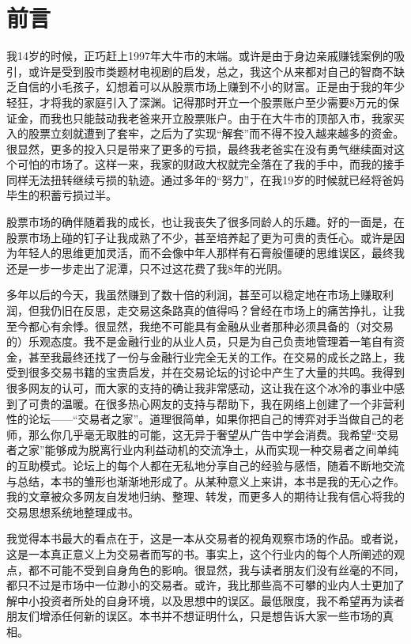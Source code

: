\section{前言}

我14岁的时候，正巧赶上1997年大牛市的末端。或许是由于身边亲戚赚钱案例的吸引，或许是受到股市类题材电视剧的启发，总之，我这个从来都对自己的智商不缺乏自信的小毛孩子，幻想着可以从股票市场上赚到不小的财富。正是由于我的年少轻狂，才将我的家庭引入了深渊。记得那时开立一个股票账户至少需要8万元的保证金，而我也只能鼓动我老爸来开立股票账户。由于在大牛市的顶部入市，我家买入的股票立刻就遭到了套牢，之后为了实现“解套”而不得不投入越来越多的资金。很显然，更多的投入只是带来了更多的亏损，最终我老爸实在没有勇气继续面对这个可怕的市场了。这样一来，我家的财政大权就完全落在了我的手中，而我的接手同样无法扭转继续亏损的轨迹。通过多年的“努力”，在我19岁的时候就已经将爸妈毕生的积蓄亏损过半。

股票市场的确伴随着我的成长，也让我丧失了很多同龄人的乐趣。好的一面是，在股票市场上碰的钉子让我成熟了不少，甚至培养起了更为可贵的责任心。或许是因为年轻人的思维更加灵活，而不会像中年人那样有石膏般僵硬的思维误区，最终我还是一步一步走出了泥潭，只不过这花费了我8年的光阴。

多年以后的今天，我虽然赚到了数十倍的利润，甚至可以稳定地在市场上赚取利润，但我仍旧在反思，走交易这条路真的值得吗？曾经在市场上的痛苦挣扎，让我至今都心有余悸。很显然，我绝不可能具有金融从业者那种必须具备的（对交易的）乐观态度。我不是金融行业的从业人员，只是为自己负责地管理着一笔自有资金，甚至我最终还找了一份与金融行业完全无关的工作。在交易的成长之路上，我受到很多交易书籍的宝贵启发，并在交易论坛的讨论中产生了大量的共鸣。我得到很多网友的认可，而大家的支持的确让我非常感动，这让我在这个冰冷的事业中感到了可贵的温暖。在很多热心网友的支持与帮助下，我在网络上创建了一个非营利性的论坛——“交易者之家”。道理很简单，如果你把自己的博弈对手当做自己的老师，那么你几乎毫无取胜的可能，这无异于奢望从广告中学会消费。我希望“交易者之家”能够成为脱离行业内利益动机的交流净土，从而实现一种交易者之间单纯的互助模式。论坛上的每个人都在无私地分享自己的经验与感悟，随着不断地交流与总结，本书的雏形也渐渐地形成了。从某种意义上来讲，本书是我的无心之作。我的文章被众多网友自发地归纳、整理、转发，而更多人的期待让我有信心将我的交易思想系统地整理成书。

我觉得本书最大的看点在于，这是一本从交易者的视角观察市场的作品。或者说，这是一本真正意义上为交易者而写的书。事实上，这个行业内的每个人所阐述的观点，都不可能不受到自身角色的影响。很显然，我与读者朋友们没有丝毫的不同，都只不过是市场中一位渺小的交易者。或许，我比那些高不可攀的业内人士更加了解中小投资者所处的自身环境，以及思想中的误区。最低限度，我不希望再为读者朋友们增添任何新的误区。本书并不想证明什么，只是想告诉大家一些市场的真相。

